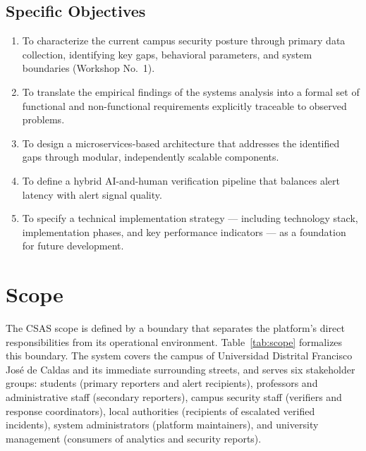\documentclass[12pt, oneside]{article}
\begin{document}
\subsection{Specific Objectives}

\begin{enumerate}[leftmargin=*, itemsep=4pt]
\item To characterize the current campus security posture through primary data
collection, identifying key gaps, behavioral parameters, and system boundaries
(Workshop No.~1).
\item To translate the empirical findings of the systems analysis into a formal set of
functional and non-functional requirements explicitly traceable to observed problems.
\item To design a microservices-based architecture that addresses the identified gaps
through modular, independently scalable components.
\item To define a hybrid AI-and-human verification pipeline that balances alert latency
with alert signal quality.
\item To specify a technical implementation strategy --- including technology stack,
implementation phases, and key performance indicators --- as a foundation for future
development.
\end{enumerate}

\section{Scope}

The CSAS scope is defined by a boundary that separates the platform's direct
responsibilities from its operational environment. Table~\ref{tab:scope} formalizes
this boundary. The system covers the campus of Universidad Distrital Francisco
Jos\'e de Caldas and its immediate surrounding streets, and serves six stakeholder
groups: students (primary reporters and alert recipients), professors and administrative
staff (secondary reporters), campus security staff (verifiers and response coordinators),
local authorities (recipients of escalated verified incidents), system administrators
(platform maintainers), and university management (consumers of analytics and
security reports).
\end{document}
